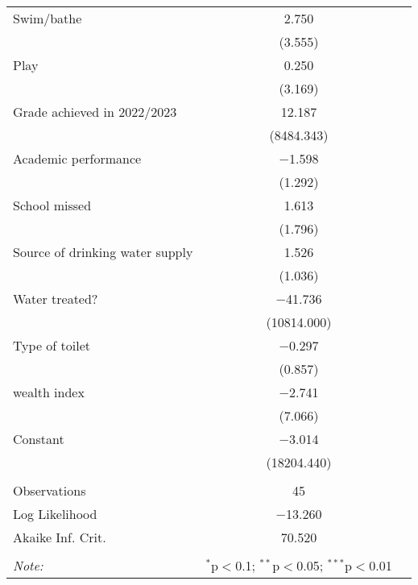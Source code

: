 \begin{longtable}{@{\extracolsep{5pt}}lcc}
  Swim/bathe & 2.750 \\ 
  & (3.555) \\ 
  Play & 0.250 \\ 
  & (3.169) \\ 
  Grade achieved in 2022/2023 & 12.187 \\ 
  & (8484.343) \\ 
  Academic performance & $-$1.598 \\ 
  & (1.292) \\ 
  School missed & 1.613 \\ 
  & (1.796) \\ 
  Source of drinking water supply & 1.526 \\ 
  & (1.036) \\ 
  Water treated? & $-$41.736 \\ 
  & (10814.000) \\ 
  Type of toilet & $-$0.297 \\ 
  & (0.857) \\ 
  wealth index & $-$2.741 \\ 
  & (7.066) \\ 
  Constant & $-$3.014 \\ 
  & (18204.440) \\ 
 \hline \\[-1.8ex] 
Observations & 45 \\ 
Log Likelihood & $-$13.260 \\ 
Akaike Inf. Crit. & 70.520 \\ 
\hline 
\hline \\[-1.8ex] 
\textit{Note:}  & \multicolumn{1}{r}{$^{*}$p$<$0.1; $^{**}$p$<$0.05; $^{***}$p$<$0.01} \\ 
\end{longtable} 
